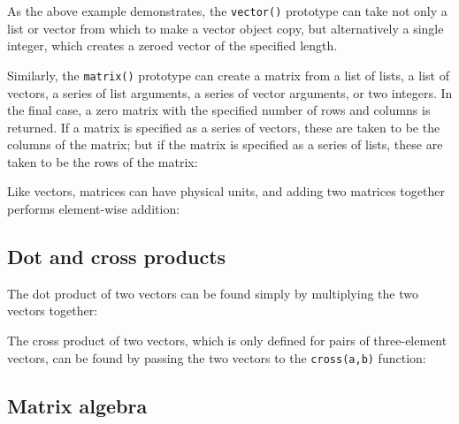 \vspace{3mm}

\vspace{3mm}

As the above example demonstrates, the {\tt vector()} prototype can take not
only a list or vector from which to make a vector object copy, but
alternatively a single integer, which creates a zeroed vector of the specified
length.

Similarly, the {\tt matrix()} prototype can create a matrix from a list of
lists, a list of vectors, a series of list arguments, a series of vector
arguments, or two integers. In the final case, a zero matrix with the specified
number of rows and columns is returned. If a matrix is specified as a series of
vectors, these are taken to be the columns of the matrix; but if the matrix is
specified as a series of lists, these are taken to be the rows of the matrix:

\vspace{3mm}

\vspace{3mm}

Like vectors, matrices can have physical units, and adding two matrices together performs element-wise addition:

\vspace{3mm}

\vspace{3mm}

\subsection{Dot and cross products}

The dot product of two vectors can be found simply by multiplying the two vectors together:

\vspace{3mm}

\vspace{3mm}

\noindent
The cross product of two vectors, which is only defined for pairs of three-element vectors, can be found by passing the two vectors to the {\tt cross(a,b)} function:

\vspace{3mm}

\vspace{3mm}


\subsection{Matrix algebra}

